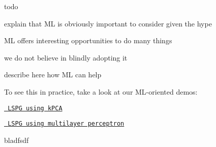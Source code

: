 todo
\begin{DoxyItemize}
\item explain that ML is obviously important to consider given the hype
\item ML offers interesting opportunities to do many things
\item we do not believe in blindly adopting it
\item describe here how ML can help
\end{DoxyItemize}

To see this in practice, take a look at our ML-\/oriented demos\+:


\begin{DoxyEnumerate}
\item \href{md_pages_demos_demo3.html}{\texttt{ LSPG using k\+PCA}}
\item \href{md_pages_demos_demo6.html}{\texttt{ LSPG using multilayer perceptron}}
\end{DoxyEnumerate}



bladfsdf 